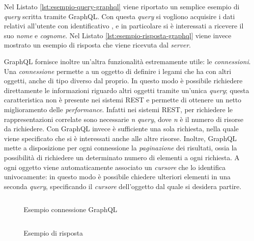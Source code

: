 Nel Listato \ref{lst:esempio-query-graphql} viene riportato un semplice esempio di \emph{query} scritta tramite GraphQL. Con questa \emph{query} si vogliono acquisire i dati relativi all'utente con identificativo , e in particolare si è interessati a ricevere il suo \emph{nome} e \emph{cognome}. Nel Listato \ref{lst:esempio-risposta-graphql} viene invece mostrato un esempio di risposta che viene ricevuta dal \emph{server}.

GraphQL fornisce inoltre un'altra funzionalità estremamente utile: le \emph{connessioni}. Una \emph{connessione} permette a un oggetto di definire i legami che ha con altri oggetti, anche di tipo diverso dal proprio. In questo modo è possibile richiedere direttamente le informazioni riguardo altri oggetti tramite un'unica \emph{query}; questa caratteristica non è presente nei sistemi REST e permette di ottenere un netto miglioramento delle \emph{performance}. Infatti nei sistemi REST, per richiedere le rappresentazioni correlate sono necessarie \emph{n} \emph{query}, dove \emph{n} è il numero di risorse da richiedere. Con GraphQL invece è sufficiente una sola richiesta, nella quale viene specificato che si è interessati anche alle altre risorse. Inoltre, GraphQL mette a disposizione per ogni connessione la \emph{paginazione} dei risultati, ossia la possibilità di richiedere un determinato numero di elementi a ogni richiesta. A ogni oggetto viene automaticamente associato un \emph{cursore} che lo identifica univocamente: in questo modo è possibile chiedere ulteriori elementi in una seconda \emph{query}, specificando il \emph{cursore} dell'oggetto dal quale si desidera partire.

\begin{figure}[ht]
	\hspace*{-1.2cm}
	\begin{minipage}[t]{0.55\textwidth}
		\begin{listing}[H]
			\inputminted{text}{2-preliminari/Codice/esempio_connessione_graphql.graphql}
			\caption{Esempio connessione GraphQL}
			\label{lst:esempio-connessione-graphql}
		\end{listing}
	\end{minipage}%
	\hspace{2mm}%
	\begin{minipage}[t]{0.55\textwidth}
		\begin{listing}[H]
			\inputminted{json}{2-preliminari/Codice/esempio_risposta_connessione_graphql.json}
			\caption{Esempio di risposta}
			\label{lst:esempio-risposta-connessione-graphql}
		\end{listing}
	\end{minipage}	
\end{figure}

